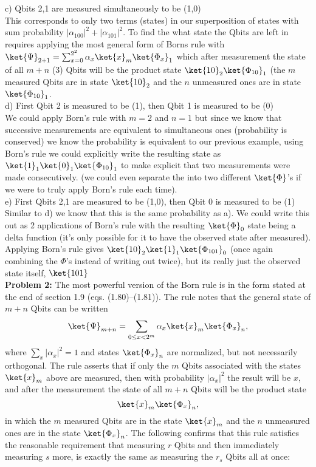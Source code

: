 c) Qbits 2,1 are measured simultaneously to be (1,0)\\

This corresponds to only two terms (states) in our superposition of states
with sum probability $|\alpha_{100}|^2+|\alpha_{101}|^2$. To find the what
state the Qbits are left in requires applying the most general form of Borns
rule with $\ket{\Psi}_{2+1}=\sum^{2^2}_{x=0}\alpha_x\ket{x}_m\ket{\Phi_x}_1$
which after measurement the state of all $m+n$ (3) Qbits will be the product
state $\ket{10}_2\ket{\Phi_{10}}_1$ (the $m$ measured Qbits are in state
$\ket{10}_2$ and the $n$ unmeasured ones are in state $\ket{\Phi_{10}}_1$.\\

d) First Qbit 2 is measured to be (1), then Qbit 1 is measured to be (0)\\

We could apply Born's rule with $m=2$ and $n=1$ but since we know that
successive measurements are equivalent to simultaneous ones (probability is
conserved) we know the probability is equivalent to our previous example,
using Born's rule we could explicitly write the resulting state as $\ket{1}_1\ket{0}_1\ket{\Phi_{10}}_1$
to make explicit that two measurements were made consecutively.
(we could even separate the into two different $\ket{\Phi}$'s if we were to
truly apply Born's rule each time).\\

e) First Qbits 2,1 are measured to be (1,0), then Qbit 0 is measured to be (1)\\

Similar to d) we know that this is the same probability as a). We could write
this out as 2 applications of Born's rule with the resulting $\ket{\Phi}_0$ state being a delta function (it's only possible for it to have the observed state
after measured). Applying Born's rule gives $\ket{10}_2\ket{1}_1\ket{\Phi_{101}}_0$ (once again combining the $\Phi$'s instead of writing out twice), but its really just the observed state itself,
$\ket{101}$\\

\textbf{Problem 2:}
The most powerful version of the Born rule is in the form stated at the end of
section
1.9 (eqs. (1.80)–(1.81)). The rule notes that the general state of $m+n$ Qbits
can be written
$$\ket{\Psi}_{m+n}=\sum_{0\leq x<2^m}\alpha_x\ket{x}_m\ket{\Phi_x}_n,$$
where $\sum_x|\alpha_x|^2=1$ and states $\ket{\Phi_x}_n$ are normalized, but
not necessarily orthogonal. The rule asserts that if only the $m$ Qbits
associated with the states $\ket{x}_m$ above are measured, then with
probability $|\alpha_x|^2$ the result will be $x$, and after the measurement
the state of all $m+n$ Qbits will be the product state
$$\ket{x}_m\ket{\Phi_x}_n,$$
in which the $m$ measured Qbits are in the state $\ket{x}_m$ and the $n$
unmeasured ones are in the state $\ket{\Phi_x}_n$. The following confirms that
this rule satisfies the reasonable requirement that measuring $r$ Qbits and
then immediately measuring $s$ more, is exactly the same as measuring the
$r_s$ Qbits all at once:\\


